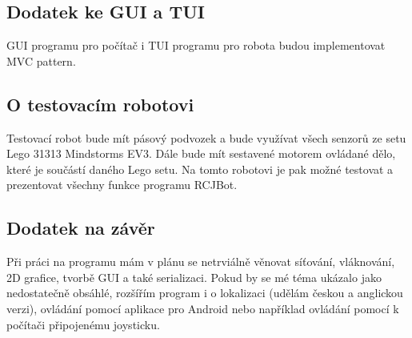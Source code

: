\documentclass[12pt, ngerman]{article}
\begin{document}
\subsection{Dodatek ke GUI a TUI}
GUI programu pro počítač i TUI programu pro robota budou implementovat MVC pattern.

\subsection{O testovacím robotovi}
Testovací robot bude mít pásový podvozek a bude využívat všech senzorů ze setu Lego 31313 Mindstorms EV3. Dále bude mít sestavené motorem ovládané dělo, které je součástí daného Lego setu. Na tomto robotovi je pak možné testovat a prezentovat všechny funkce programu RCJBot.

\subsection{Dodatek na závěr}
Při práci na programu mám v plánu se netrviálně věnovat síťování, vláknování, 2D grafice, tvorbě GUI a také serializaci. Pokud by se mé téma ukázalo jako nedostatečně obsáhlé, rozšířím program i o lokalizaci (udělám českou a anglickou verzi), ovládání pomocí aplikace pro Android nebo například ovládání pomocí k počítači připojenému joysticku.
\end{document}
